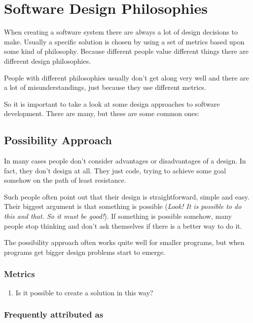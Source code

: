 \section{Software Design Philosophies}

When creating a software system there are always a lot of design
decisions to make. Usually a specific solution is chosen by using a set
of metrics based upon some kind of philosophy. Because different people
value different things there are different design philosophies.

People with different philosophies usually don't get along very well and
there are a lot of misunderstandings, just because they use different
metrics.

So it is important to take a look at some design approaches to software
development. There are many, but these are some common ones:

\subsection{Possibility Approach}

In many cases people don't consider advantages or disadvantages of a
design. In fact, they don't design at all. They just code, trying to
achieve some goal somehow on the path of least resistance.

Such people often point out that their design is straightforward, simple
and easy. Their biggest argument is that something is possible
(\emph{Look! It is possible to do this and that. So it must be good!}).
If something is possible somehow, many people stop thinking and don't
ask themselves if there is a better way to do it.

The possibility approach often works quite well for smaller programs,
but when programs get bigger design problems start to emerge.

\subsubsection{Metrics}

\begin{enumerate}
\item
  Is it possible to create a solution in this way?
\end{enumerate}

\subsubsection{Frequently attributed as}

